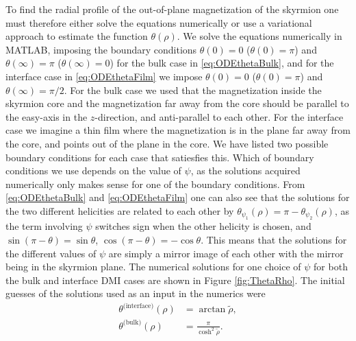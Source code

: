 \documentclass[12pt, a4paper]{article}		%
\numberwithin{equation}{section}
\begin{document}
To find the radial profile of the out-of-plane magnetization of the skyrmion one must therefore either solve the equations numerically or use a variational approach to estimate the function $\theta(\rho)$. We solve the equations numerically in MATLAB, imposing the boundary conditions $\theta(0) = 0$ ($\theta(0) = \pi$) and $\theta(\infty) = \pi$ ($\theta(\infty) = 0$) for the bulk case in \eqref{eq:ODEthetaBulk}, and for the interface case in \eqref{eq:ODEthetaFilm} we impose $\theta(0) = 0$ ($\theta(0) = \pi$) and $\theta(\infty) = \pi/2$. For the bulk case we used that the magnetization inside the skyrmion core and the magnetization far away from the core should be parallel to the easy-axis in the $z$-direction, and anti-parallel to each other. For the interface case we imagine a thin film where the magnetization is in the plane far away from the core, and points out of the plane in the core. We have listed two possible boundary conditions for each case that satiesfies this. Which of boundary conditions we use depends on the value of $\psi$, as the solutions acquired numerically only makes sense for one of the boundary conditions. From \eqref{eq:ODEthetaBulk} and \eqref{eq:ODEthetaFilm} one can also see that the solutions for the two different helicities are related to each other by $\theta_{\psi_1}(\rho) = \pi - \theta_{\psi_2}(\rho)$, as the term involving $\psi$ switches sign when the other helicity is chosen, and $\sin(\pi-\theta) = \sin\theta$, $\cos(\pi-\theta) = -\cos\theta$. This means that the solutions for the different values of $\psi$ are simply a mirror image of each other with the mirror being in the skyrmion plane. The numerical solutions for one choice of $\psi$ for both the bulk and interface DMI cases are shown in Figure \ref{fig:ThetaRho}. The initial guesses of the solutions used as an input in the numerics were
\begin{align}
\theta^{\text{(interface)}}(\rho) &= \arctan\tilde{\rho}, \\
\theta^{\text{(bulk)}}(\rho) &= \frac{\pi}{\cosh^2\tilde{\rho}}.
\end{align}
\end{document}

